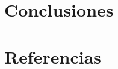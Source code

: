 \documentclass[12pt,oneside]{reedthesis}
\begin{document}
\hypertarget{conclusiones-3}{%
\chapter{Conclusiones}\label{conclusiones-3}}

\backmatter

\hypertarget{referencias}{%
\chapter*{Referencias}\label{referencias}}


\noindent

\setlength{\parindent}{-0.20in}

\hypertarget{refs}{}
\end{document}
